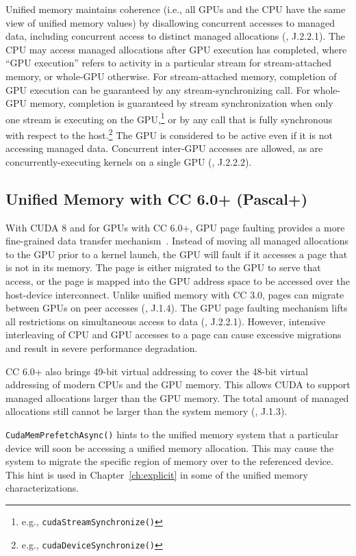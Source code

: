 Unified memory maintains coherence (i.e., all GPUs and the CPU have the same view of unified memory values) by disallowing concurrent accesses to managed data, including concurrent access to distinct managed allocations (\cite{nvidia2014cuda60}, J.2.2.1).
The CPU may access managed allocations after GPU execution has completed, where ``GPU execution'' refers to activity in a particular stream for stream-attached memory, or whole-GPU otherwise.
For stream-attached memory, completion of GPU execution can be guaranteed by any stream-synchronizing call.
For whole-GPU memory, completion is guaranteed by stream synchronization when only one stream is executing on the GPU,\footnote{e.g., \texttt{cudaStreamSynchronize()}} or by any call that is fully synchronous with respect to the host.\footnote{e.g., \texttt{cudaDeviceSynchronize()}}
The GPU is considered to be active even if it is not accessing managed data.
Concurrent inter-GPU accesses are allowed, as are concurrently-executing kernels on a single GPU (\cite{nvidia2014cuda60}, J.2.2.2).

\subsection{Unified Memory with CC 6.0+ (Pascal+)}
\label{sec:unified-cc6}

With CUDA 8 and for GPUs with CC 6.0+, GPU page faulting provides a more fine-grained data transfer mechanism~\cite{nvidia2017cuda80}.
Instead of moving all managed allocations to the GPU prior to a kernel launch, the GPU will fault if it accesses a page that is not in its memory.
The page is either migrated to the GPU to serve that access, or the page is mapped into the GPU address space to be accessed over the host-device interconnect.
Unlike unified memory with CC 3.0, pages can migrate between GPUs on peer accesses (\cite{nvidia2017cuda80}, J.1.4).
The GPU page faulting mechanism lifts all restrictions on simultaneous access to data (\cite{nvidia2017cuda80}, J.2.2.1).
However, intensive interleaving of CPU and GPU accesses to a page can cause excessive migrations and result in severe performance degradation.

CC 6.0+ also brings 49-bit virtual addressing to cover the 48-bit virtual addressing of modern CPUs and the GPU memory.
This allows CUDA to support managed allocations larger than the GPU memory.
The total amount of managed allocations still cannot be larger than the system memory (\cite{nvidia2017cuda80}, J.1.3).

\texttt{CudaMemPrefetchAsync()} hints to the unified memory system that a particular device will soon be accessing a unified memory allocation.
This may cause the system to migrate the specific region of memory over to the referenced device.
This hint is used in Chapter~\ref{ch:explicit} in some of the unified memory characterizations.

